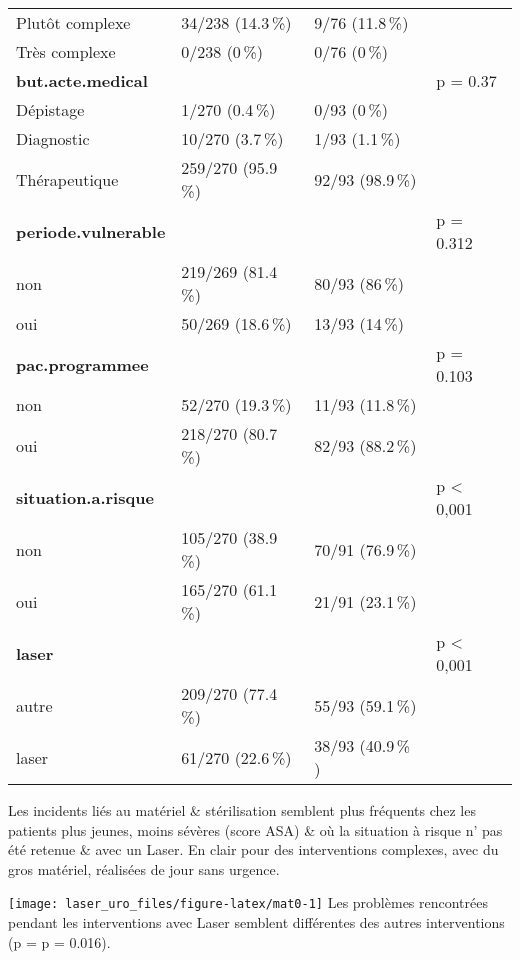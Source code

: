 \documentclass[a4paper,fontsize=10pt,french]{scrartcl}
\begin{document}
\begin{table}
\begin{tabular}[t]{l|l|l|l}
Plutôt complexe & 34/238 (14.3\,\%) & 9/76 (11.8\,\%) & \\
 
Très complexe & 0/238 (0\,\%) & 0/76 (0\,\%) & \\
\midrule
\textbf{but.acte.medical} &  &  & p = 0.37\\
 
Dépistage & 1/270 (0.4\,\%) & 0/93 (0\,\%) & \\
 
Diagnostic & 10/270 (3.7\,\%) & 1/93 (1.1\,\%) & \\
 
Thérapeutique & 259/270 (95.9\,\%) & 92/93 (98.9\,\%) & \\
\midrule
\textbf{periode.vulnerable} &  &  & p = 0.312\\
 
non & 219/269 (81.4\,\%) & 80/93 (86\,\%) & \\
 
oui & 50/269 (18.6\,\%) & 13/93 (14\,\%) & \\
\midrule
\textbf{pac.programmee} &  &  & p = 0.103\\
 
non & 52/270 (19.3\,\%) & 11/93 (11.8\,\%) & \\
 
oui & 218/270 (80.7\,\%) & 82/93 (88.2\,\%) & \\
\midrule
\textbf{situation.a.risque} &  &  & p < 0,001\\
non & 105/270 (38.9\,\%) & 70/91 (76.9\,\%) & \\
oui & 165/270 (61.1\,\%) & 21/91 (23.1\,\%) & \\
\midrule
\textbf{laser} &  &  & p < 0,001\\
autre & 209/270 (77.4\,\%) & 55/93 (59.1\,\%) & \\
laser & 61/270 (22.6\,\%) & 38/93 (40.9\,\% ) & \\
 \bottomrule
\end{tabular}
\end{table}

Les incidents liés au matériel \& stérilisation semblent plus fréquents
chez les patients plus jeunes, moins sévères (score ASA) \& où la
situation à risque n' pas été retenue \& avec un Laser. En clair pour
des interventions complexes, avec du gros matériel, réalisées de jour
sans urgence.

\texttt{[image: laser\_uro\_files/figure-latex/mat0-1]}
Les problèmes rencontrées pendant les interventions avec Laser semblent
différentes des autres interventions (p = p = 0.016).
\end{document}
